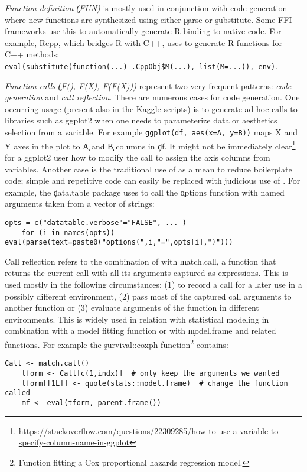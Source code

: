 \documentclass[review,screen,acmsmall,anonymous=true]{acmart}
\begin{document}
\begin{compactitem}[---]
  \item \emph{Function definition \c{(FUN)}} is mostly used in conjunction with
    code generation where new functions are synthesized using either \c{parse}
    or \c{substitute}. Some FFI frameworks use this to automatically generate R
    binding to native code. For example, \c{Rcpp}, which bridges R with C++,
    uses \eval to generate R functions for C++ methods:\\
    \lstinline|eval(substitute(function(...) .CppObj$M(...), list(M=...)), env)|.

  \item \emph{Function calls \c{(F(), F(X), F(F(X)))}} represent two very
    frequent patterns: \emph{code generation} and \emph{call reflection}. There
    are numerous cases for code generation.
    One occurring usage (present also in the Kaggle scripts) is to generate
    ad-hoc calls to libraries such as \c{ggplot2} when one needs to
    parameterize data or aesthetics selection from a variable. For example
    \lstinline|ggplot(df, aes(x=A, y=B))| maps X and Y axes in the plot to
    \c{A} and \c{B} columns in \c{df}. It might not be immediately
    clear\footnote{\cf
    \url{https://stackoverflow.com/questions/22309285/how-to-use-a-variable-to-specify-column-name-in-ggplot}}
    for a ggplot2 user how to modify the call to assign the axis columns from
    variables. Another case is the traditional use of \eval as a mean to reduce
    boilerplate code; simple and repetitive code can easily be replaced with
    judicious use of \eval. For example, the \c{data.table} package uses \eval
    to call the \c{options} function with named arguments taken from a vector
    of strings:

    \begin{lstlisting}[gobble=2]
    opts = c("datatable.verbose"="FALSE", ... )
    for (i in names(opts)) eval(parse(text=paste0("options(",i,"=",opts[i],")")))
    \end{lstlisting}

    Call reflection refers to the combination of \eval with \c{match.call}, a
    function that returns the current call with all its arguments captured as
    expressions. This is used mostly in the following circumstances: (1) to
    record a call for a later use in a possibly different environment, (2) pass
    most of the captured call arguments to another function or (3) evaluate
    arguments of the function in different environments. This is widely used in
    relation with statistical modeling in combination with a model fitting
    function or with \c{model.frame} and related functions. For example the
    \c{survival::coxph} function\footnote{Function fitting a Cox proportional
    hazards regression model.} contains:
    \begin{lstlisting}[gobble=2]
    Call <- match.call()
    tform <- Call[c(1,indx)]  # only keep the arguments we wanted
    tform[[1L]] <- quote(stats::model.frame)  # change the function called
    mf <- eval(tform, parent.frame())
    \end{lstlisting}


\end{compactitem}
\end{document}
